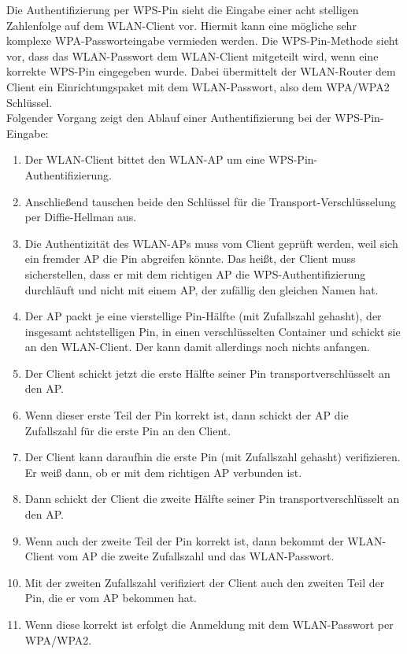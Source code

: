 Die Authentifizierung per WPS-Pin sieht die Eingabe einer acht stelligen Zahlenfolge auf dem WLAN-Client vor. Hiermit kann eine mögliche sehr komplexe WPA-Passworteingabe vermieden werden. Die WPS-Pin-Methode sieht vor, dass das WLAN-Passwort dem WLAN-Client mitgeteilt wird, wenn eine korrekte WPS-Pin eingegeben wurde. Dabei übermittelt der WLAN-Router dem Client ein Einrichtungspaket mit dem WLAN-Passwort, also dem WPA/WPA2 Schlüssel. \\
Folgender Vorgang zeigt den Ablauf einer Authentifizierung bei der WPS-Pin-Eingabe:

\begin{enumerate}
	\item Der WLAN-Client bittet den WLAN-AP um eine WPS-Pin-Authentifizierung.
	\item Anschließend tauschen beide den Schlüssel für die Transport-Verschlüsselung per Diffie-Hellman aus.
	\item Die Authentizität des WLAN-APs muss vom Client geprüft werden, weil sich ein fremder AP die Pin abgreifen könnte. Das heißt, der Client muss sicherstellen, dass er mit dem richtigen AP die WPS-Authentifizierung durchläuft und nicht mit einem AP, der zufällig den gleichen Namen hat.
	\item Der AP packt je eine vierstellige Pin-Hälfte (mit Zufallszahl gehasht), der insgesamt achtstelligen Pin, in einen verschlüsselten Container und schickt sie an den WLAN-Client. Der kann damit allerdings noch nichts anfangen.
	\item Der Client schickt jetzt die erste Hälfte seiner Pin transportverschlüsselt an den AP.
	\item Wenn dieser erste Teil der Pin korrekt ist, dann schickt der AP die Zufallszahl für die erste Pin an den Client.
	\item Der Client kann daraufhin die erste Pin (mit Zufallszahl gehasht) verifizieren. Er weiß dann, ob er mit dem richtigen AP verbunden ist.
	\item Dann schickt der Client die zweite Hälfte seiner Pin transportverschlüsselt an den AP.
	\item Wenn auch der zweite Teil der Pin korrekt ist, dann bekommt der WLAN-Client vom AP die zweite Zufallszahl und das WLAN-Passwort.
	\item Mit der zweiten Zufallszahl verifiziert der Client auch den zweiten Teil der Pin, die er vom AP bekommen hat.
	\item Wenn diese korrekt ist erfolgt die Anmeldung mit dem WLAN-Passwort per WPA/WPA2.
\end{enumerate}

